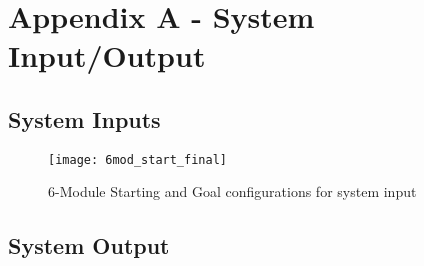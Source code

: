\newpage
\section{Appendix A - System Input/Output}
\subsection{System Inputs}
\begin{figure}[h]
	\centering
	\texttt{[image: 6mod\_start\_final]}
	\caption{6-Module Starting and Goal configurations for system input}
	\label{6mod_start_goal}
\end{figure}

\subsection{System Output}
\inputminted[fontsize=\footnotesize]{python}{appendices/inputOutputOutput.txt}
